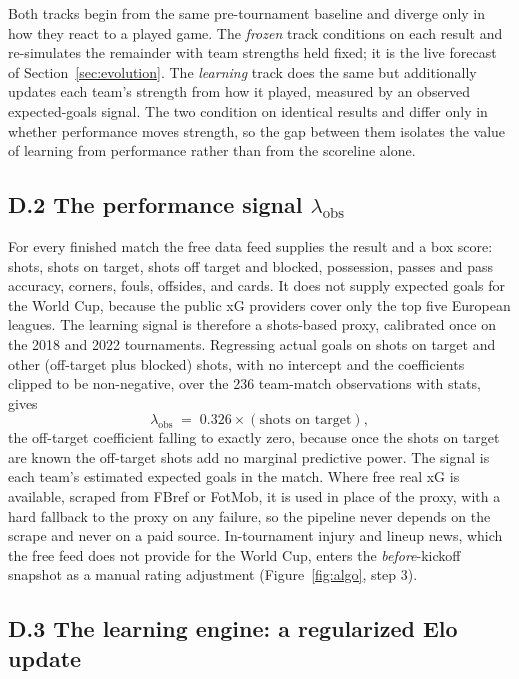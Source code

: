 \documentclass[11pt,letterpaper]{article}
\begin{document}
Both tracks begin from the same pre-tournament baseline and diverge only in how they react to a played game. The \emph{frozen} track conditions on each result and re-simulates the remainder with team strengths held fixed; it is the live forecast of Section~\ref{sec:evolution}. The \emph{learning} track does the same but additionally updates each team's strength from how it played, measured by an observed expected-goals signal. The two condition on identical results and differ only in whether performance moves strength, so the gap between them isolates the value of learning from performance rather than from the scoreline alone.

\subsection*{D.2 \quad The performance signal $\lambda_{\text{obs}}$}

For every finished match the free data feed supplies the result and a box score: shots, shots on target, shots off target and blocked, possession, passes and pass accuracy, corners, fouls, offsides, and cards. It does not supply expected goals for the World Cup, because the public xG providers cover only the top five European leagues. The learning signal is therefore a shots-based proxy, calibrated once on the 2018 and 2022 tournaments. Regressing actual goals on shots on target and other (off-target plus blocked) shots, with no intercept and the coefficients clipped to be non-negative, over the 236 team-match observations with stats, gives
\[
\lambda_{\text{obs}} \;=\; 0.326 \times (\text{shots on target}),
\]
the off-target coefficient falling to exactly zero, because once the shots on target are known the off-target shots add no marginal predictive power. The signal is each team's estimated expected goals in the match. Where free real xG is available, scraped from FBref or FotMob, it is used in place of the proxy, with a hard fallback to the proxy on any failure, so the pipeline never depends on the scrape and never on a paid source. In-tournament injury and lineup news, which the free feed does not provide for the World Cup, enters the \emph{before}-kickoff snapshot as a manual rating adjustment (Figure~\ref{fig:algo}, step 3).

\subsection*{D.3 \quad The learning engine: a regularized Elo update}
\end{document}
